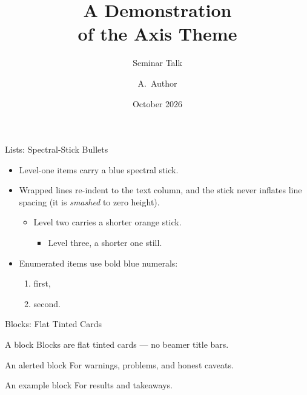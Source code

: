 \documentclass[aspectratio=169,11pt]{beamer}
\title{A Demonstration\\ of the Axis Theme}
\subtitle{Seminar Talk}
\author{A.\ Author}
\institute{Department of Chemistry \quad$\cdot$\quad University of Somewhere}
\date{October 2026}
\begin{document}
\begin{frame}[plain]
  \titlepage
\end{frame}


\begin{frame}{Lists: Spectral-Stick Bullets}
  \begin{itemize}
    \item Level-one items carry a blue spectral stick.
    \item Wrapped lines re-indent to the text column, and the
          stick never inflates line spacing (it is \emph{smashed}
          to zero height).
      \begin{itemize}
        \item Level two carries a shorter orange stick.
          \begin{itemize}
            \item Level three, a shorter one still.
          \end{itemize}
      \end{itemize}
    \item Enumerated items use bold blue numerals:
      \begin{enumerate}
        \item first,
        \item second.
      \end{enumerate}
  \end{itemize}
\end{frame}

\begin{frame}{Blocks: Flat Tinted Cards}
  \begin{block}{A block}
    Blocks are flat tinted cards --- no beamer title bars.
  \end{block}
  \begin{alertblock}{An alerted block}
    For warnings, problems, and honest caveats.
  \end{alertblock}
  \begin{exampleblock}{An example block}
    For results and takeaways.
  \end{exampleblock}
\end{frame}
\end{document}
